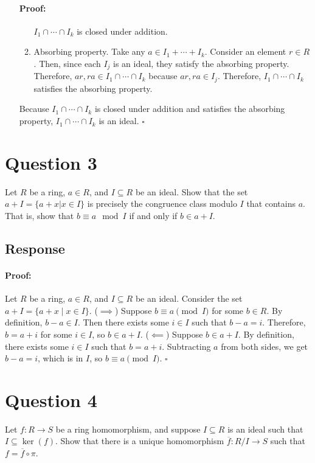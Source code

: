 \documentclass [12pt] {article}
\newenvironment{proof}{\paragraph{Proof:}}{\hfill$\square$}
\begin{document}
\begin{enumerate}
\begin{proof}
\begin{enumerate}
                    $I_1 \cap \cdots \cap I_k$ is closed under addition.
                \item Absorbing property. Take any $a \in I_1 + \cdots + I_k$. Consider an element 
                    $r \in R$. Then, since each $I_j$ is an ideal, they satisfy the absorbing
                    property. Therefore, $ar, ra \in I_1 \cap \cdots \cap I_k$ because 
                    $ar, ra \in I_j$. Therefore, $I_1 \cap \cdots \cap I_k$ satisfies the absorbing
                    property.
            \end{enumerate}
            Because $I_1 \cap \cdots \cap I_k$ is closed under addition and satisfies the absorbing property, 
            $I_1 \cap \cdots \cap I_k$ is an ideal.
        \end{proof}
\end{enumerate}
\newpage

\section*{Question 3}
Let $R$ be a ring, $a\in R$, and $I\subseteq R$ be an ideal. Show that the set $a+I=\{a+x|x\in I\}$ is precisely the congruence class modulo $I$ that contains $a$. That is, show that $b\equiv a\mod I$ if and only if $b\in a+I$. 
\subsection*{Response}
\begin{proof}
    Let $R$ be a ring, $a \in R$, and $I \subseteq R$ be an ideal. Consider the set 
    $a + I = \{ a + x \mid x \in I \}$.
    \newline
    ($\implies$) Suppose $b \equiv a \pmod{I}$ for some $b \in R$. By definition, $b - a \in I$. 
    Then there exists some $i \in I$ such that $b - a = i$. Therefore, $b = a + i$ for some 
    $i \in I$, so $b \in a + I$.
    \newline
    ($\impliedby$) Suppose $b \in a + I$. By definition, there exists some $i \in I$ such that
    $b = a + i$. Subtracting $a$ from both sides, we get $b - a = i$, which is in $I$, so 
    $b \equiv a \pmod{I}$.
\end{proof}
\newpage

\section*{Question 4}
Let $f:R\to S$ be a ring homomorphism, and suppose $I\subseteq R$ is an ideal such that $I\subseteq \ker(f)$. Show that there is a unique homomorphism $\overline{f}:R/I\to S$ such that $f=\overline{f}\circ\pi$.
\end{document}
